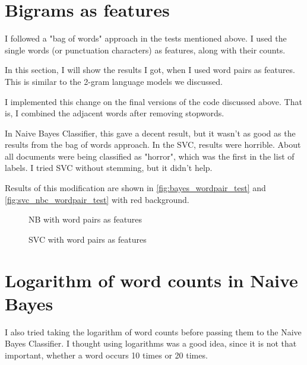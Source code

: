 \section{Bigrams as features}

I followed a "bag of words" approach in the tests mentioned above. I used the single words (or punctuation characters) as features, along with their counts.

In this section, I will show the results I got, when I used word pairs as features. This is similar to the 2-gram language models we discussed.

I implemented this change on the final versions of the code discussed above. That is, I combined the adjacent words after removing stopwords.

In Naive Bayes Classifier, this gave a decent result, but it wasn't as good as the results from the bag of words approach. In the SVC, results were horrible. About all documents were being classified as "horror", which was the first in the list of labels. I tried SVC without stemming, but it didn't help.

Results of this modification are shown in \autoref{fig:bayes_wordpair_test} and \autoref{fig:svc_nbc_wordpair_test} with red background.

\begin{figure}[htpb]
    \caption{NB with word pairs as features}
    \label{fig:bayes_wordpair_test}
    \begin{tcolorbox}[colback=red!30!white,
            title=NB - Word pairs]
        
    \end{tcolorbox}
\end{figure}

\begin{figure}[htpb]
    \caption{SVC with word pairs as features}
    \label{fig:svc_nbc_wordpair_test}
    \begin{tcolorbox}[colback=red!30!white,
            title=SVC - Word pairs]
        
    \end{tcolorbox}
\end{figure}

\section{Logarithm of word counts in Naive Bayes}

I also tried taking the logarithm of word counts before passing them to the Naive Bayes Classifier. I thought using logarithms was a good idea, since it is not that important, whether a word occurs 10 times or 20 times.

